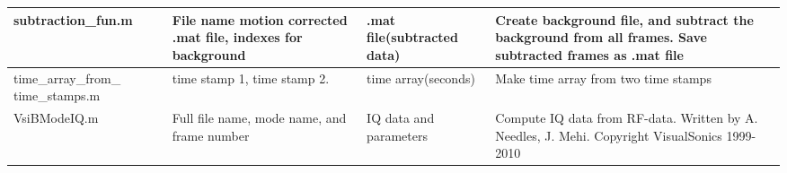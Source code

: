 \begin{center}
\begin{longtable}{@{} p{3cm} p{3cm} p{2cm} p{4cm} @{}}
			\textbf{subtraction\_fun.m} & File name motion corrected .mat file, indexes for background & .mat file(subtracted data) & Create background file, and subtract the background from all frames. Save subtracted frames as .mat file \\ \hline 
			time\_array\_from\_ time\_stamps.m & time stamp 1, time stamp 2. & time array(seconds) & Make time array from two time stamps \\ \hline 
			VsiBModeIQ.m & Full file name, mode name, and frame number & IQ data and parameters & Compute IQ data from RF-data. Written by A. Needles, J. Mehi. Copyright VisualSonics 1999-2010 \\

		\end{longtable}
	\end{center}
